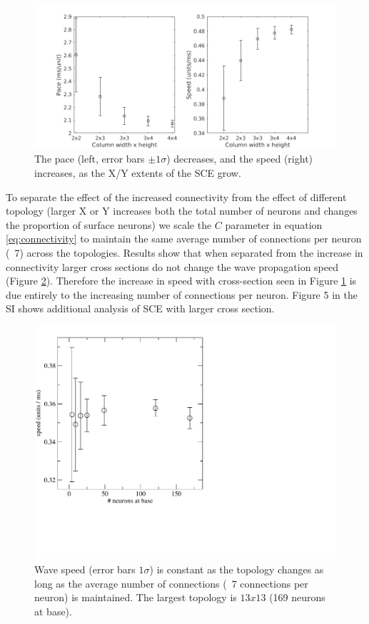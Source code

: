 \documentclass[12pt]{article}
\begin{document}
\begin{figure}[!htb]
 \caption{ The pace (left, error bars $\pm 1 \sigma$) decreases, and the speed (right) increases, as the X/Y extents of the SCE grow.}
 \label{fig:delay_topology}
 \centering
   \includegraphics[width=\textwidth]{fig/WaveSpeed_Topology}
\end{figure}

To separate the effect of the increased connectivity from the effect of different topology (larger X or Y increases both the total number of neurons and changes the proportion of surface neurons) we scale the $C$ parameter in equation \ref{eq:connectivity} to maintain the same average number of connections per neuron (~7) across the topologies.
Results show that when separated from the increase in connectivity larger cross sections do not change the wave propagation speed (Figure \ref{fig:delay_topology_avgconn}).
Therefore the increase in speed with cross-section seen in Figure \ref{fig:delay_topology} is due entirely to the increasing number of connections per neuron.
Figure 5 in the SI shows additional analysis of SCE with larger cross section. 

\begin{figure}[!htb]
 \caption{ Wave speed (error bars $1\sigma$) is constant as the topology changes as long as the average number of connections (~7 connections per neuron) is maintained. The largest topology is $13x13$ (169 neurons at base).}
 \label{fig:delay_topology_avgconn}
 \centering
   \includegraphics[width=\textwidth]{fig/speed_vs_thick_m}
\end{figure}
\color{black}
\FloatBarrier
\end{document}
